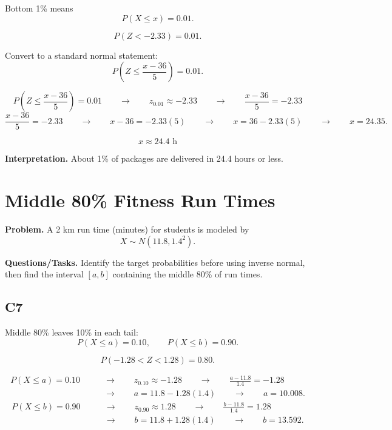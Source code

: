 	Bottom 1\% means
	\[
	P(X \leq x) = 0.01.
	\]
	
	\[
	P(Z<-2.33)=0.01.
	\]
	
	
	Convert to a standard normal statement:
	\[
	P\left(Z \leq \frac{x - 36}{5}\right) = 0.01.
	\]
	
	\[
	P\left(Z \leq \frac{x - 36}{5}\right)=0.01
	\qquad \longrightarrow \qquad
	z_{0.01}\approx -2.33
	\qquad \longrightarrow \qquad
	\frac{x - 36}{5}=-2.33
	\]
	\[
	\frac{x - 36}{5}=-2.33
	\qquad \longrightarrow \qquad
	x-36=-2.33(5)
	\qquad \longrightarrow \qquad
	x=36-2.33(5)
	\qquad \longrightarrow \qquad
	x=24.35.
	\]
	
	\[
	x \approx 24.4\text{ h}
	\]
	
	\textbf{Interpretation.} About 1\% of packages are delivered in 24.4 hours or less.
	
	\section{Middle 80\% Fitness Run Times}
	
	\textbf{Problem.} A 2 km run time (minutes) for students is modeled by
	\[
	X \sim N(11.8, 1.4^2).
	\]
	
	\textbf{Questions/Tasks.} Identify the target probabilities before using inverse normal, then find the interval $[a,b]$ containing the middle 80\% of run times.
	
	\subsection*{C7}
	
	Middle 80\% leaves 10\% in each tail:
	\[
	P(X \leq a) = 0.10, \qquad P(X \leq b) = 0.90.
	\]
	
	\[
	P(-1.28<Z<1.28)=0.80.
	\]
	
	
	\[
	\begin{aligned}
	P(X \leq a)=0.10
	&\qquad \longrightarrow \qquad z_{0.10}\approx -1.28
	\qquad \longrightarrow \qquad \frac{a-11.8}{1.4}=-1.28\\
	&\qquad \longrightarrow \qquad a=11.8-1.28(1.4)
	\qquad \longrightarrow \qquad a=10.008.
	\end{aligned}
	\]
	\[
	\begin{aligned}
	P(X \leq b)=0.90
	&\qquad \longrightarrow \qquad z_{0.90}\approx 1.28
	\qquad \longrightarrow \qquad \frac{b-11.8}{1.4}=1.28\\
	&\qquad \longrightarrow \qquad b=11.8+1.28(1.4)
	\qquad \longrightarrow \qquad b=13.592.
	\end{aligned}
	\]
	

